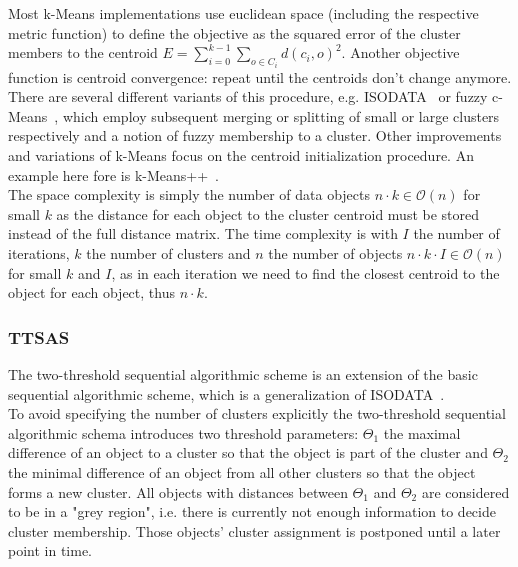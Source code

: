 Most k-Means implementations use euclidean space (including the respective metric function) to define the objective as the squared error of the cluster members to the centroid $E = \sum_{i=0}^{k-1}\sum_{o \in C_i} d(c_i,o)^2$. Another objective function is centroid convergence: repeat until the centroids don't change anymore. There are several different variants of this procedure, e.g. ISODATA~\cite{ball1967clustering} or fuzzy c-Means~\cite{fuzzy-c-means}, which employ subsequent merging or splitting of small or large clusters respectively and a notion of fuzzy membership to a cluster. Other improvements and variations of k-Means focus on the centroid initialization procedure. An example here fore is k-Means++~\cite{arthur2007k}. \\

The space complexity is simply the number of data objects $n \cdot k \in \mathcal{O}(n)$ for small $k$ as the distance for each object to the cluster centroid must be stored instead of the full distance matrix. The time complexity is with $I$ the number of iterations, $k$ the number of clusters and $n$ the number of objects $n \cdot k \cdot I \in \mathcal{O}(n)$ for small $k$ and $I$, as in each iteration we need to find the closest centroid to the object for each object, thus $n \cdot k$.

\subsubsection{TTSAS}\label{\positionnumber}
The two-threshold sequential algorithmic scheme is an extension of the basic sequential algorithmic scheme, which is a generalization of ISODATA~\cite{ball1967clustering, THEODORIDIS2009627}. \\
To avoid specifying the number of clusters explicitly the two-threshold sequential algorithmic schema introduces two threshold parameters: $\Theta_1$ the maximal difference of an object to a cluster so that the object is part of the cluster and $\Theta_2$ the minimal difference of an object from all other clusters so that the object forms a new cluster. All objects with distances between $\Theta_1$ and $\Theta_2$ are considered to be in a "grey region", i.e. there is currently not enough information to decide cluster membership. Those objects' cluster assignment is postponed until a later point in time. \\

